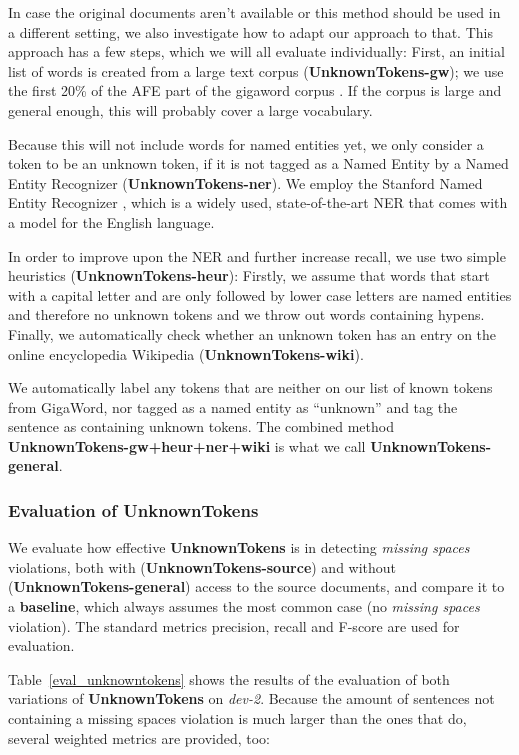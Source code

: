 \documentclass[a4paper,10pt]{scrartcl}
\theoremstyle{style}
\begin{document}
In case the original documents aren't available or this method should be used in a different setting, we also investigate how to adapt our approach to that. This approach has a few steps, which we will all evaluate individually:
First, an initial list of words is created from a large text corpus (\textbf{UnknownTokens-gw}); we use the first 20\% of the AFE part of the gigaword corpus \citep{gigaword}. If the corpus is large and general enough, this will probably cover a large vocabulary.

Because this will not include words for named entities yet, we only consider a token to be an unknown token, if it is not tagged as a Named Entity by a Named Entity Recognizer (\textbf{UnknownTokens-ner}). We employ the Stanford Named Entity Recognizer \citep{stanfordNER}, which is a widely used, state-of-the-art NER that comes with a model for the English language.

In order to improve upon the NER and further increase recall, we use two simple heuristics (\textbf{UnknownTokens-heur}): Firstly, we assume that words that start with a capital letter and are only followed by lower case letters are named entities and therefore no unknown tokens and we throw out words containing hypens. Finally, we automatically check whether an unknown token has an entry on the online encyclopedia Wikipedia (\textbf{UnknownTokens-wiki}).

We automatically label any tokens that are neither on our list of known tokens from GigaWord, nor tagged as a named entity as ``unknown'' and tag the sentence as containing unknown tokens. The combined method \textbf{UnknownTokens-gw+heur+ner+wiki} is what we call \textbf{UnknownTokens-general}.

\subsubsection{Evaluation of UnknownTokens}
We evaluate how effective \textbf{UnknownTokens} is in detecting \textit{missing spaces} violations, both with (\textbf{UnknownTokens-source}) and without (\textbf{UnknownTokens-general}) access to the source documents, and compare it to a \textbf{baseline}, which always assumes the most common case (no \textit{missing spaces} violation).
The standard metrics precision, recall and F-score are used for evaluation.

Table~\ref{eval_unknowntokens} shows the results of the evaluation of both variations of \textbf{UnknownTokens} on \textit{dev-2}. Because the amount of sentences not containing a missing spaces violation is much larger than the ones that do, several weighted metrics are provided, too:
\end{document}
